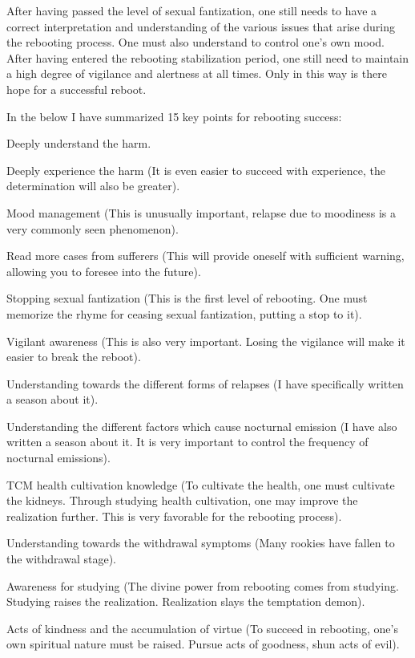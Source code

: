 \documentclass[
]{book}
\begin{document}
After having passed the level of sexual fantization, one still needs to have a correct interpretation and understanding of the various issues that arise during the rebooting process. One must also understand to control one's own mood. After having entered the rebooting stabilization period, one still need to maintain a high degree of vigilance and alertness at all times. Only in this way is there hope for a successful reboot.

In the below I have summarized 15 key points for rebooting success:

Deeply understand the harm.

Deeply experience the harm (It is even easier to succeed with experience, the determination will also be greater).

Mood management (This is unusually important, relapse due to moodiness is a very commonly seen phenomenon).

Read more cases from sufferers (This will provide oneself with sufficient warning, allowing you to foresee into the future).

Stopping sexual fantization (This is the first level of rebooting. One must memorize the rhyme for ceasing sexual fantization, putting a stop to it).

Vigilant awareness (This is also very important. Losing the vigilance will make it easier to break the reboot).

Understanding towards the different forms of relapses (I have specifically written a season about it).

Understanding the different factors which cause nocturnal emission (I have also written a season about it. It is very important to control the frequency of nocturnal emissions).

TCM health cultivation knowledge (To cultivate the health, one must cultivate the kidneys. Through studying health cultivation, one may improve the realization further. This is very favorable for the rebooting process).

Understanding towards the withdrawal symptoms (Many rookies have fallen to the withdrawal stage).

Awareness for studying (The divine power from rebooting comes from studying. Studying raises the realization. Realization slays the temptation demon).

Acts of kindness and the accumulation of virtue (To succeed in rebooting, one's own spiritual nature must be raised. Pursue acts of goodness, shun acts of evil).
\end{document}
